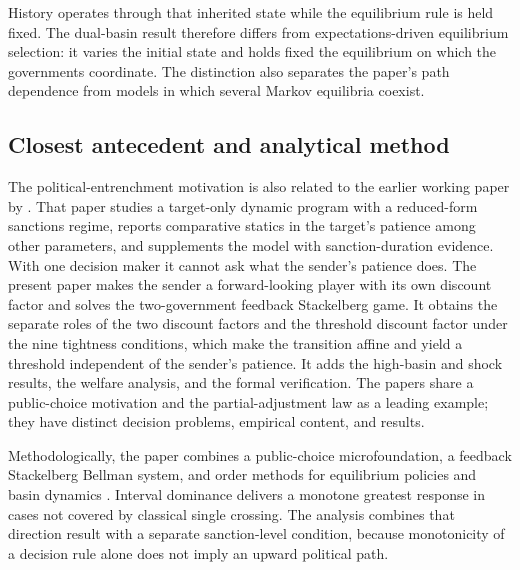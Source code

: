History operates through that inherited state while the equilibrium rule
is held fixed. The dual-basin result therefore differs from
expectations-driven equilibrium selection: it varies the initial state and
holds fixed the equilibrium on which the governments coordinate. The distinction
also separates the paper's path dependence from models in which several
Markov equilibria coexist.

\subsection{Closest antecedent and analytical method}

The political-entrenchment motivation is also related to the earlier
working paper by \citet{GongZhong2025}. That paper studies a
target-only dynamic program with a reduced-form sanctions regime, reports
comparative statics in the target's patience among other parameters, and
supplements the model with sanction-duration evidence. With one decision
maker it cannot ask what the sender's patience does. The present paper makes
the sender a forward-looking player with its own discount factor and solves the
two-government feedback Stackelberg game. It obtains the separate roles of the
two discount factors and the threshold discount factor under the nine tightness
conditions, which make the transition affine and yield a threshold
independent of the sender's patience. It adds the high-basin and
shock results, the welfare
analysis, and the formal verification. The papers share a public-choice
motivation and the partial-adjustment law as a leading example; they have
distinct decision problems, empirical content, and results.

Methodologically, the paper combines a public-choice microfoundation,
a feedback Stackelberg Bellman system, and order methods for equilibrium
policies and basin dynamics
\citep{basar1999,krawczyk_petkov_multistage,StokeyLucas1989,
Curtat1996,Bertsekas2012,topkis1998,MilgromShannon1994,
QuahStrulovici2009,Krishnamurthy2023}. Interval dominance delivers a
monotone greatest response in cases not covered by classical single
crossing. The analysis combines that direction result with a separate
sanction-level condition, because monotonicity of a decision rule alone
does not imply an upward political path.

